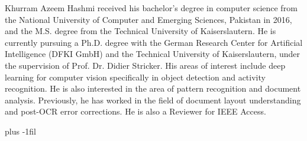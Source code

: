 \documentclass{ieeeaccess}
\begin{document}
\clearpage

\vspace{-1,5 cm}
\begin{IEEEbiography}{Khurram Azeem Hashmi} received his bachelor’s degree in computer science from the National University of Computer and Emerging Sciences, Pakistan in 2016, and the M.S. degree from the Technical University of Kaiserslautern. He is currently pursuing a Ph.D. degree with the German Research Center for Artificial Intelligence (DFKI GmbH) and the Technical University of Kaiserslautern, under the supervision of Prof. Dr. Didier Stricker. His areas of interest include deep learning for computer vision specifically in object detection and activity recognition. He is also interested in the area of pattern recognition and document analysis. Previously, he has worked in the field of document layout understanding and post-OCR error corrections. He is also a Reviewer for IEEE Access.
\end{IEEEbiography}

\vskip 0pt plus -1fil
\end{document}
